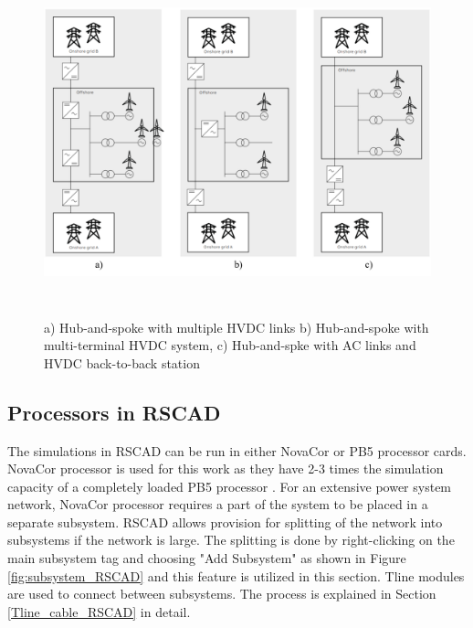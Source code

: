 \begin{figure}[H]
\centering
    \includegraphics[height = 10cm,width = 15cm]{Diagrams/Chapter_4/ABB_Hub_Spoke_3.png}
    \caption{a) Hub-and-spoke with multiple HVDC links b) Hub-and-spoke with multi-terminal HVDC system, c) Hub-and-spke with AC links and HVDC back-to-back station \cite{abb_hvdc_2018}}
    \label{fig:ABB_Hub_Spoke_3}
\end{figure}


\subsection{Processors in RSCAD}\label{split_system}
The simulations in RSCAD can be run in either NovaCor or PB5 processor cards. NovaCor processor is used for this work as they have 2-3 times the simulation capacity of a completely loaded PB5 processor \cite{noauthor_novacor_nodate}. For an extensive power system network, NovaCor processor requires a part of the system to be placed in a separate subsystem. RSCAD allows provision for splitting of the network into subsystems if the network is large. The splitting is done by right-clicking on the main subsystem tag and choosing "Add Subsystem" as shown in Figure \ref{fig:subsystem_RSCAD} and this feature is utilized in this section. Tline modules are used to connect between subsystems. The process is explained in Section \ref{Tline_cable_RSCAD} in detail.

